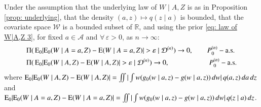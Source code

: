 \begin{proposition}\label{prop: consistency para}
    Under the assumption that the underlying law of $W \mid A,Z$ is as in Proposition \ref{prop: underlying}, that the density $(a,z) \mapsto q (z \mid a)$ is bounded, that the covariate space $\mathcal{W}$ is a bounded subset of $\mathbb{R}$, and using the prior \eqref{eq: law of W|A,Z 3}, for fixed $a \in \mathcal{A}$ and $\forall \, \varepsilon >0$, as $n \rightarrow \infty$:
    \begin{align*}
        &\Pi ( \, \mathrm{E}_0 | 
\mathrm{E}_0 (W\mid A=a,Z)- \mathrm{E}(W\mid A=a,Z) | > \varepsilon \mid \mathcal{D}^{(n)}) \rightarrow 0, \quad \quad P^{(n)}_0-\text{a.s.} \\
        &\Pi ( \, \mathrm{E}_0 | 
\mathrm{E}_0 (W\mid A,Z)- \mathrm{E}(W\mid A,Z) | > \varepsilon \mid \mathcal{D}^{(n)}) \rightarrow 0, \quad \quad \quad \quad \quad \, \, \, \, P^{(n)}_0-\text{a.s.}
    \end{align*}
    where $\mathrm{E}_0 | \mathrm{E}_0 (W\mid A,Z)- \mathrm{E}(W\mid A,Z) | = \iint |\int w (g_0(w\mid a,z)- g(w\mid a,z)) \, dw | \, q(a, z) \, d a \, d z$ and $\mathrm{E}_0 | \mathrm{E}_0 (W\mid A=a,Z)- \mathrm{E}(W\mid A=a,Z) | = \iint |\int w (g_0(w\mid a,z)- g(w\mid a,z)) \, dw | \, q(z \mid a) \, d z$.
\end{proposition}

